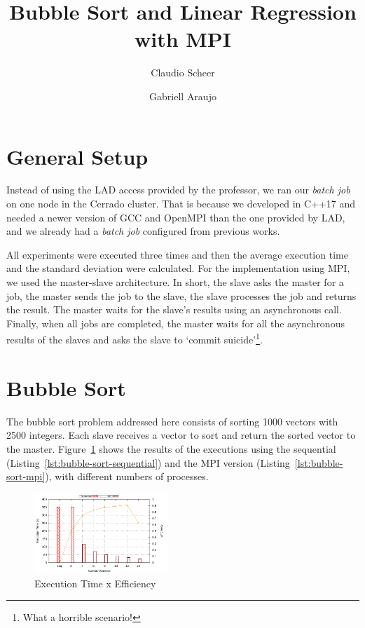\documentclass[10pt, twocolumn]{report}
\begin{document}
\title{Bubble Sort and Linear Regression with MPI}

\author[1]{Claudio Scheer}
\author[1]{Gabriell Araujo}

\maketitle

\section {General Setup}
Instead of using the LAD access provided by the professor, we ran our \textit{batch job} on one node in the Cerrado cluster. That is because we developed in C++17 and needed a newer version of GCC and OpenMPI than the one provided by LAD, and we already had a \textit{batch job} configured from previous works.

All experiments were executed three times and then the average execution time and the standard deviation were calculated. For the implementation using MPI, we used the master-slave architecture. In short, the slave asks the master for a job, the master sends the job to the slave, the slave processes the job and returns the result. The master waits for the slave's results using an asynchronous call. Finally, when all jobs are completed, the master waits for all the asynchronous results of the slaves and asks the slave to `commit suicide'\footnote{What a horrible scenario!}.

\section{Bubble Sort}
The bubble sort problem addressed here consists of sorting 1000 vectors with 2500 integers. Each slave receives a vector to sort and return the sorted vector to the master. Figure~\ref{fig:bubble-sort-time} shows the results of the executions using the sequential (Listing~\ref{lst:bubble-sort-sequential}) and the MPI version (Listing~\ref{lst:bubble-sort-mpi}), with different numbers of processes.

\begin{figure}[ht]
	\centering
	\includegraphics[width=0.45\textwidth]{../logs/scripts/bubble-sort-time.pdf}
	\caption{Execution Time x Efficiency}
	\label{fig:bubble-sort-time}
\end{figure}
\end{document}
